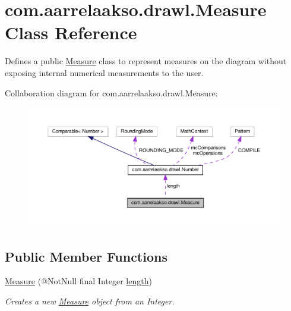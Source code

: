 \hypertarget{classcom_1_1aarrelaakso_1_1drawl_1_1_measure}{}\section{com.\+aarrelaakso.\+drawl.\+Measure Class Reference}
\label{classcom_1_1aarrelaakso_1_1drawl_1_1_measure}


Defines a public \hyperlink{classcom_1_1aarrelaakso_1_1drawl_1_1_measure}{Measure} class to represent measures on the diagram without exposing internal numerical measurements to the user.  




Collaboration diagram for com.\+aarrelaakso.\+drawl.\+Measure\+:\nopagebreak
\begin{figure}[H]
\begin{center}
\leavevmode
\includegraphics[width=350pt]{d5/ddb/classcom_1_1aarrelaakso_1_1drawl_1_1_measure__coll__graph}
\end{center}
\end{figure}
\subsection*{Public Member Functions}
\begin{DoxyCompactItemize}
\item 
\hyperlink{classcom_1_1aarrelaakso_1_1drawl_1_1_measure_a1960447b4b9dc0f4e71a2b86af31c52c}{Measure} (@Not\+Null final Integer \hyperlink{classcom_1_1aarrelaakso_1_1drawl_1_1_measure_aef040b9b0dd7d4a925448d0854c2444a}{length})
\begin{DoxyCompactList}\small\item\em Creates a new \hyperlink{classcom_1_1aarrelaakso_1_1drawl_1_1_measure}{Measure} object from an Integer. \end{DoxyCompactList}\end{DoxyCompactItemize}
